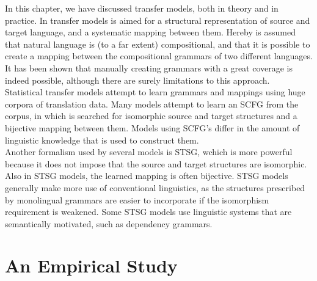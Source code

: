 \documentclass[a4paper, 11pt]{report}
\theoremstyle{definition}
\theoremstyle{plain}
\begin{document}
In this chapter, we have discussed transfer models, both in theory and in practice. In transfer models is aimed for a structural representation of source and target language, and a systematic mapping between them. Hereby is assumed that natural language is (to a far extent) compositional, and that it is possible to create a mapping between the compositional grammars of two different languages. It has been shown that manually creating grammars with a great coverage is indeed possible, although there are surely limitations to this approach.\\
Statistical transfer models attempt to learn grammars and mappings using huge corpora of translation data. Many models attempt to learn an SCFG from the corpus, in which is searched for isomorphic source and target structures and a bijective mapping between them. Models using SCFG's differ in the amount of linguistic knowledge that is used to construct them. \\
Another formalism used by several models is STSG, wchich is more powerful because it does not impose that the source and target structures are isomorphic. Also in STSG models, the learned mapping is often bijective. STSG models generally make more use of conventional linguistics, as the structures prescribed by monolingual grammars are easier to incorporate if the isomorphism requirement is weakened. Some STSG models use linguistic systems that are semantically motivated, such as dependency grammars.

%
%







%
%

\chapter{An Empirical Study}
\end{document}
